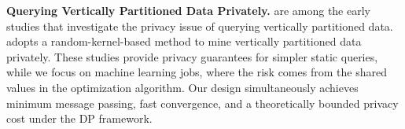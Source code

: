 {\bf Querying Vertically Partitioned Data Privately.} \cite{vaidya2002privacy, evfimievski2004privacy, dwork2004privacy} are among the early studies that investigate the privacy issue of querying vertically partitioned data. \cite{kenthapadi2012privacy} adopts a random-kernel-based method to mine vertically partitioned data privately. These studies provide privacy guarantees for simpler static queries, while we focus on machine learning jobs, where the risk comes from the shared values in the optimization algorithm. Our design simultaneously achieves minimum message passing, fast convergence, and a theoretically bounded privacy cost under the DP framework.












